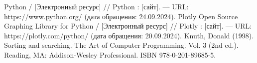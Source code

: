 \begin{thebibliography}{}
      Python /  [Электронный ресурс] // Python : [сайт]. — URL: https://www.python.org/ (дата обращения: 24.09.2024).
      Plotly Open Source Graphing Library for Python /  [Электронный ресурс] // Plotly : [сайт]. — URL: https://plotly.com/python/ (дата обращения: 20.09.2024).
     Knuth, Donald (1998). Sorting and searching. The Art of Computer Programming. Vol. 3 (2nd ed.). Reading, MA: Addison-Wesley Professional. ISBN 978-0-201-89685-5.
\end{thebibliography}